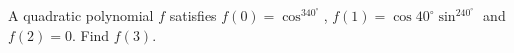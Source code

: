 A quadratic polynomial $f$ satisfies $f(0)=\cos^340^\circ$, $f(1)=\cos40^\circ\sin^240^\circ$ and $f(2)=0$. Find $f(3)$.

